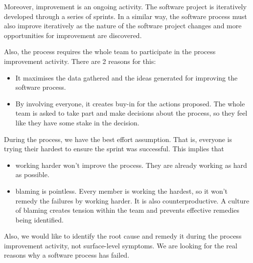 \documentclass[a4paper, openany]{memoir}
\begin{document}
Moreover, improvement is an ongoing activity. The software project is iteratively developed through a series of sprints. In a similar way, the software process must also improve iteratively as the nature of the software project changes and more opportunities for improvement are discovered.

Also, the process requires the whole team to participate in the process improvement activity. There are 2 reasons for this:
\begin{itemize}
    \item It maximises the data gathered and the ideas generated for improving the software process.
    \item By involving everyone, it creates buy-in for the actions proposed. The whole team is asked to take part and make decisions about the process, so they feel like they have some stake in the decision.
\end{itemize}

During the process, we have the best effort assumption. That is, everyone is trying their hardest to ensure the sprint was successful. This implies that
\begin{itemize}
    \item working harder won't improve the process. They are already working as hard as possible.
    \item blaming is pointless. Every member is working the hardest, so it won't remedy the failures by working harder. It is also counterproductive. A culture of blaming creates tension within the team and prevents effective remedies being identified.
\end{itemize}

Also, we would like to identify the root cause and remedy it during the process improvement activity, not surface-level symptoms. We are looking for the real reasons why a software process has failed.
\end{document}

